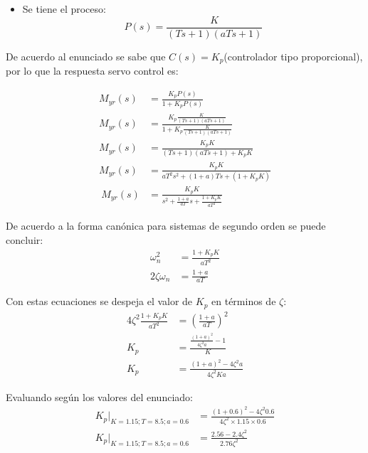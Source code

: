 \begin{ejercicio}

  \begin{itemize}
    \item 
    Se tiene el proceso:
    \begin{equation*}
      P(s) = \frac{K}{(Ts+1)(aTs+1)}
    \end{equation*}
  \end{itemize}

  De acuerdo al enunciado se sabe que $C(s) = K_p$(controlador tipo proporcional), por lo que la respuesta servo control es:

  \begin{align*}
    M_{yr}(s) &= \frac{K_p P(s)}{1 + K_p P(s)}
    \\
    M_{yr}(s) &= \frac{K_p \frac{K}{(Ts+1)(aTs+1)}}{1 + K_p \frac{K}{(Ts+1)(aTs+1)}}
    \\
    M_{yr}(s) &= \frac{K_p K}{(Ts+1)(aTs+1) + K_p K}
    \\
    M_{yr}(s) &= \frac{K_p K}{a T^2 s^2 + (1+a)Ts + (1 + K_p K)}
    \\\
    M_{yr}(s) &= \frac{K_p K}{s^2 + \frac{1+a}{aT}s + \frac{1 + K_p K}{aT^2}}
  \end{align*}

  De acuerdo a la forma canónica para sistemas de segundo orden se puede concluir:
  \begin{align*}
    \omega_n^2 &= \frac{1 + K_p K}{aT^2}
    \\
    2\zeta \omega_n &= \frac{1+a}{aT}
  \end{align*}

  Con estas ecuaciones se despeja el valor de $K_p$ en términos de $\zeta$:
  \begin{align*}
    4\zeta^2 \frac{1 + K_p K}{aT^2} &= \left(\frac{1+a}{aT}\right)^2
    \\
    K_p &= \frac{\frac{(1+a)^2}{4 \zeta^2 a}-1}{K}
    \\
    K_p &= \frac{(1+a)^2-4 \zeta^2 a}{4 \zeta^2 K a }
  \end{align*}

  Evaluando según los valores del enunciado:
  \begin{align*}
    K_p|_{K=1.15; T=8.5; a=0.6} &= \frac{(1+0.6)^2-4 \zeta^2 0.6}{4 \zeta^2 \times 1.15 \times 0.6}
    \\
    K_p|_{K=1.15; T=8.5; a=0.6} &= \frac{2.56 - 2.4 \zeta^2 }{2.76 \zeta^2 }
  \end{align*}


\end{ejercicio}
